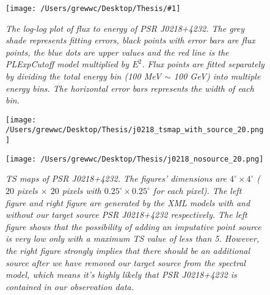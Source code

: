 \documentclass[12pt]{report}
\newcommand{\mycaption}[1]{\caption{\textit{\footnotesize #1}}}
\newcommand{\singleFig}[3]{
 \begin{figure}[!ht]
  \centering
  \texttt{[image: /Users/grewwc/Desktop/Thesis/\#1]}
  \mycaption{#3}
 \label{fig: #1}
 \end{figure}
}
\newcommand{\change}[1]{
  $<$\colorbox{red}{\textbf{change}}$>$#1$<$\colorbox{red}{\textbf{/change}}$>$
}
\begin{document}
            \singleFig{j0218_cur.png}{0.40}{
              The log-log plot of flux to energy of PSR J0218+4232. The grey shade represents 
              fitting errors, black points with error bars are flux points, the blue dots are upper values and the 
              red line is the PLExpCutoff model multiplied by $E^2$. Flux points 
              are fitted separately by dividing the total energy bin (100 MeV $\sim$ 100 GeV) into multiple energy bins.
              The horizontal error bars represents the width of each bin. \\
            }
            \vspace{1cm}
            \begin{figure}[!ht]
              \begin{center}
              \begin{minipage}{0.46\textwidth}
                \begin{center} 
                  \texttt{[image: /Users/grewwc/Desktop/Thesis/j0218\_tsmap\_with\_source\_20.png]}
                \end{center}
              \end{minipage}
              \begin{minipage}{0.45\textwidth}
                \begin{center}
                  \texttt{[image: /Users/grewwc/Desktop/Thesis/j0218\_nosource\_20.png]}
                \end{center}
              \end{minipage}
            \end{center}
            \mycaption{TS maps of PSR J0218+4232. The figures' dimensions are 
            $4^{\circ} \times 4^{\circ}$ ($20$ pixels $\times$ $20$ pixels with 
            $0.25^{\circ} \times 0.25^{\circ}$ for each pixel). The \textsf{left}
            figure and \textsf{right} figure are generated by the XML models with and without our 
            target source PSR J0218+4232 respectively. The \textsf{left} figure shows that the 
            possibility of adding an imputative point source is very low only with a maximum TS value of 
            less than 5. However, the \textsf{right} figure strongly implies that there should be an 
            additional source after we have removed our target source from the spectral model, 
            which means it's highly likely that PSR J0218+4232 is contained in our observation data.}
            \label{fig: j0218_tsmap_comparison_20}
            \end{figure}
\end{document}

